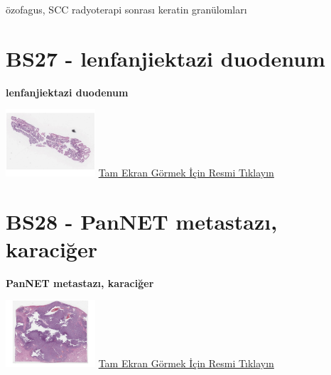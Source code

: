 \documentclass[
  letterpaper,
  DIV=11,
  numbers=noendperiod]{scrreprt}
\begin{document}
\begin{tcolorbox}[enhanced jigsaw, colbacktitle=quarto-callout-tip-color!10!white, colback=white, titlerule=0mm, opacityback=0, colframe=quarto-callout-tip-color-frame, opacitybacktitle=0.6, bottomrule=.15mm, breakable, coltitle=black, title=\textcolor{quarto-callout-tip-color}{\faLightbulb}\hspace{0.5em}{Tanı}, toprule=.15mm, toptitle=1mm, bottomtitle=1mm, arc=.35mm, rightrule=.15mm, leftrule=.75mm, left=2mm]

özofagus, SCC radyoterapi sonrası keratin granülomları

\end{tcolorbox}

\hypertarget{sec-BS27}{%
\section{BS27 - lenfanjiektazi duodenum}\label{sec-BS27}}

\textbf{lenfanjiektazi duodenum}

\href{https://images.patolojiatlasi.com/BS27/HE.html}{\includegraphics[width=0.25\textwidth,height=\textheight]{./screenshots/thumbnail_BS27-HE.png}}
\href{https://images.patolojiatlasi.com/BS27/HE.html}{Tam Ekran Görmek
İçin Resmi Tıklayın}

\hypertarget{sec-BS28}{%
\section{BS28 - PanNET metastazı, karaciğer}\label{sec-BS28}}

\textbf{PanNET metastazı, karaciğer}

\href{https://images.patolojiatlasi.com/BS28/HE.html}{\includegraphics[width=0.25\textwidth,height=\textheight]{./screenshots/thumbnail_BS28-HE.png}}
\href{https://images.patolojiatlasi.com/BS28/HE.html}{Tam Ekran Görmek
İçin Resmi Tıklayın}
\end{document}
